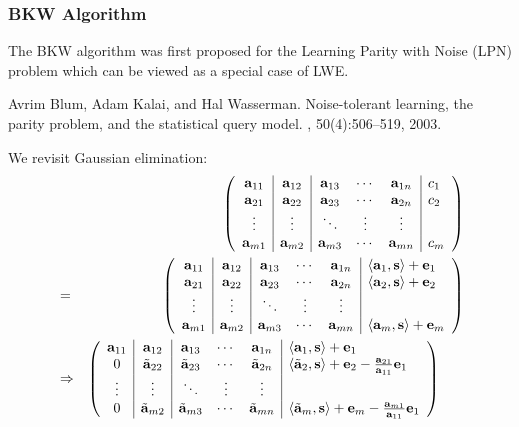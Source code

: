 \documentclass[10pt]{beamer}
\newcommand{\dotp}[2]{\ensuremath{\left\langle {#1},{#2}\right\rangle}\xspace}
\newcommand{\shortvec}[1]{\tilde{\mathbf{#1}}\xspace}
\renewcommand{\vec}[1]{\mathbf{#1}\xspace}
\begin{document}
\begin{frame}[allowframebreaks]
\frametitle{BKW Algorithm}

The BKW algorithm was first proposed for the Learning Parity with Noise (LPN) problem which can be viewed as a special case of LWE.

\vspace{1em}

\begin{thebibliography}{foobar}
Avrim Blum, Adam Kalai, and Hal Wasserman.
\newblock Noise-tolerant learning, the parity problem, and the statistical query model.
, 50(4):506--519, 2003.
\end{thebibliography}

\framebreak

We revisit Gaussian elimination:
\begin{eqnarray*}
& & \left(
\begin{array}{c|c|ccc|l}
\bold{a}_{11} & \bold{a}_{12} & \bold{a}_{13} & \cdots & \bold{a}_{1n} & c_1\\
\bold{a}_{21} & \bold{a}_{22} & \bold{a}_{23} & \cdots & \bold{a}_{2n} & c_2\\
\vdots & \vdots & \ddots & \vdots & \vdots\\
\bold{a}_{m1} & \bold{a}_{m2} & \bold{a}_{m3} & \cdots & \bold{a}_{mn} & c_{m}
\end{array}
\right)\\
& = & \left(
\begin{array}{c|c|ccc|l}
\bold{a}_{11} & \bold{a}_{12} & \bold{a}_{13} & \cdots & \bold{a}_{1n} & \dotp{\vec{a}_1}{\vec{s}} + \vec{e}_1\\
\bold{a}_{21} & \bold{a}_{22} & \bold{a}_{23} & \cdots & \bold{a}_{2n} & \dotp{\vec{a}_2}{\vec{s}} + \vec{e}_2\\
\vdots & \vdots & \ddots & \vdots & \vdots\\
\bold{a}_{m1} & \bold{a}_{m2} & \bold{a}_{m3} & \cdots & \bold{a}_{mn} & \dotp{\vec{a}_m}{\vec{s}} + \vec{e}_m
\end{array}
\right)\\
& \Rightarrow  & \left(
\begin{array}{c|c|ccc|l}
\bold{a}_{11} & \bold{a}_{12} & \bold{a}_{13} & \cdots & \bold{a}_{1n} & \dotp{\vec{a}_1}{\vec{s}} + \vec{e}_1\\
0 & \tilde{\bold{a}}_{22} & \tilde{\bold{a}}_{23} & \cdots & \tilde{\bold{a}}_{2n} & \dotp{\shortvec{a}_2}{\vec{s}} + \vec{e}_2 - \frac{\bold{a}_{21}}{\bold{a}_{11}}\vec{e}_1\\
\vdots & \vdots & \ddots & \vdots & \vdots\\
0 & \tilde{\bold{a}}_{m2} & \tilde{\bold{a}}_{m3} & \cdots & \tilde{\bold{a}}_{mn} & \dotp{\shortvec{a}_m}{\vec{s}} + \vec{e}_m - \frac{\bold{a}_{m1}}{\bold{a}_{11}}\vec{e}_1
\end{array}
\right)\phantom{\Longrightarrow}
\end{eqnarray*}


\end{frame}
\end{document}
